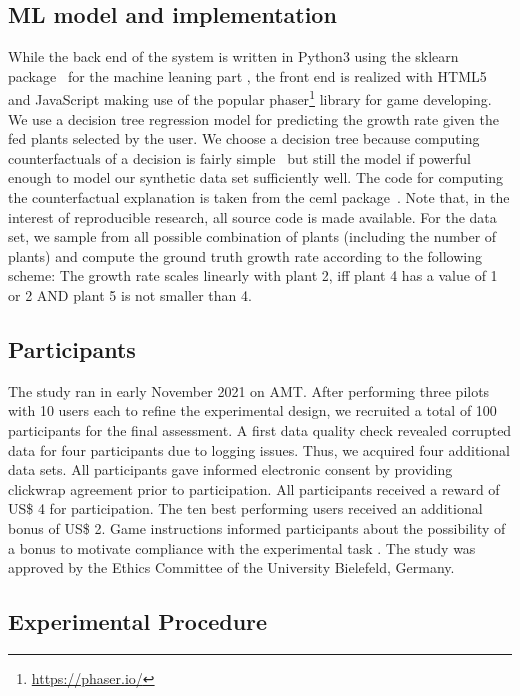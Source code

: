 {\subsection{ML model and implementation}
While the back end of the system is written in Python3 using the sklearn package~\citep{pedregosa_scikit-learn_2011} for the machine leaning part , the front end is realized with HTML5 and JavaScript making use of the popular phaser\footnote{\url{https://phaser.io/}} library for game developing.
We use a decision tree regression model for predicting the growth rate given the fed plants selected by the user. We choose a decision tree because computing counterfactuals of a decision is fairly simple~\citep{artelt_counterfactuals_survey_2019} but still the model if powerful enough to model our synthetic data set sufficiently well.
The code for computing the counterfactual explanation is taken from the ceml package~\citep{artelt_ceml_2019}.
Note that, in the interest of reproducible research, all source code is made available.
For the data set, we sample from all possible combination of plants (including the number of plants) and compute the ground truth growth rate according to the following scheme:
The growth rate scales linearly with plant 2, iff plant 4 has a value of 1 or 2 AND plant 5 is not smaller than 4.


\subsection{Participants}

The study ran in early November 2021 on \gls{AMT}.
After performing three pilots with 10 users each to refine the experimental design, we recruited a total of 100 participants for the final assessment. %
A first data quality check revealed corrupted data for four participants due to logging issues. Thus, we acquired four additional data sets. 
All participants gave informed electronic consent by providing clickwrap agreement prior to participation.
All participants received a reward of US\$ 4 for participation. 
The ten best performing users received an additional bonus of US\$ 2. 
Game instructions informed participants about the possibility of a bonus to motivate compliance with the experimental task \citep{bansal_updates_2019}.
The study was approved by the Ethics Committee of the University Bielefeld, Germany.

\subsection{Experimental Procedure}\label{subsec:experimental-procedure}

}
